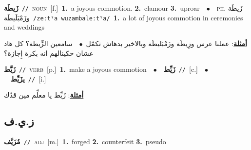 \documentclass[10pt,a4paper,twoside]{article} %
\begin{document}
\begin{multicols}{2}
{\setlength\topsep{0pt}\textbf{\foreignlanguage{arabic}{زَيطَة}}\ {\color{gray}\texttt{//}\color{black}}\ \textsc{noun}\ [f.]\ \textbf{1.}~a joyous commotion.  \textbf{2.}~clamour  \textbf{3.}~uproar\ \ $\bullet$\ \ \textsc{ph.} \color{gray} \foreignlanguage{arabic}{زَيطَة وزَمْبَلَيطَة}\color{black}\ {\color{gray}\texttt{/{\sffamily zeːtˤa wuzambaleːtˤa}/}\color{black}}\ \textbf{1.}~a lot of joyous commotion in ceremonies and weddings\  \begin{flushright}\color{gray}\foreignlanguage{arabic}{\textbf{\underline{\foreignlanguage{arabic}{أمثلة}}}: عملنا عرس وزِيطَة وزَمْبَليطَة وبالاخير بدهاش تكمّل\ $\bullet$\ \  سامعين الزِّيطة؟ كل هاد عشان حكينالهم انه بكرة إِجازة؟}\end{flushright}\color{black}} \vspace{2mm}

{\setlength\topsep{0pt}\textbf{\foreignlanguage{arabic}{زَيَّط}}\ {\color{gray}\texttt{//}\color{black}}\ \textsc{verb}\ [p.]\ \textbf{1.}~make a joyous commotion\ \ $\bullet$\ \ \setlength\topsep{0pt}\textbf{\foreignlanguage{arabic}{زَيِّط}}\ {\color{gray}\texttt{//}\color{black}}\ [c.]\ \ $\bullet$\ \ \setlength\topsep{0pt}\textbf{\foreignlanguage{arabic}{يزَيِّط}}\ {\color{gray}\texttt{//}\color{black}}\ [i.]\  \begin{flushright}\color{gray}\foreignlanguage{arabic}{\textbf{\underline{\foreignlanguage{arabic}{أمثلة}}}: زَيِّط يا معلِّم مين قدّك}\end{flushright}\color{black}} \vspace{2mm}

\vspace{-3mm}
\subsection*{\color{blue}\foreignlanguage{arabic}{ز.ي.ف}\color{blue}{}} 

{\setlength\topsep{0pt}\textbf{\foreignlanguage{arabic}{مُزَيَّف}}\ {\color{gray}\texttt{//}\color{black}}\ \textsc{adj}\ [m.]\ \textbf{1.}~forged  \textbf{2.}~counterfeit  \textbf{3.}~pseudo\ } \vspace{2mm}


\end{multicols}
\end{document}
